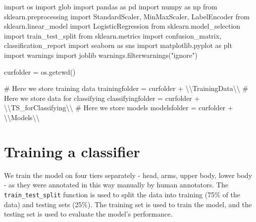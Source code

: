 \documentclass[
  letterpaper,
  DIV=11,
  numbers=noendperiod]{scrreprt}
\newenvironment{Shaded}{\begin{snugshade}}{\end{snugshade}}
\newcommand{\CharTok}[1]{\textcolor[rgb]{0.13,0.47,0.30}{#1}}
\newcommand{\CommentTok}[1]{\textcolor[rgb]{0.37,0.37,0.37}{#1}}
\newcommand{\ImportTok}[1]{\textcolor[rgb]{0.00,0.46,0.62}{#1}}
\newcommand{\NormalTok}[1]{\textcolor[rgb]{0.00,0.23,0.31}{#1}}
\newcommand{\OperatorTok}[1]{\textcolor[rgb]{0.37,0.37,0.37}{#1}}
\newcommand{\StringTok}[1]{\textcolor[rgb]{0.13,0.47,0.30}{#1}}
\begin{document}
\begin{Shaded}
\begin{Highlighting}[]
\ImportTok{import}\NormalTok{ os}
\ImportTok{import}\NormalTok{ glob}
\ImportTok{import}\NormalTok{ pandas }\ImportTok{as}\NormalTok{ pd}
\ImportTok{import}\NormalTok{ numpy }\ImportTok{as}\NormalTok{ np}
\ImportTok{from}\NormalTok{ sklearn.preprocessing }\ImportTok{import}\NormalTok{ StandardScaler, MinMaxScaler, LabelEncoder}
\ImportTok{from}\NormalTok{ sklearn.linear\_model }\ImportTok{import}\NormalTok{ LogisticRegression}
\ImportTok{from}\NormalTok{ sklearn.model\_selection }\ImportTok{import}\NormalTok{ train\_test\_split}
\ImportTok{from}\NormalTok{ sklearn.metrics }\ImportTok{import}\NormalTok{ confusion\_matrix, classification\_report}
\ImportTok{import}\NormalTok{ seaborn }\ImportTok{as}\NormalTok{ sns}
\ImportTok{import}\NormalTok{ matplotlib.pyplot }\ImportTok{as}\NormalTok{ plt}
\ImportTok{import}\NormalTok{ warnings}
\ImportTok{import}\NormalTok{ joblib}
\NormalTok{warnings.filterwarnings(}\StringTok{"ignore"}\NormalTok{)}

\NormalTok{curfolder }\OperatorTok{=}\NormalTok{ os.getcwd()}

\CommentTok{\# Here we store training data}
\NormalTok{trainingfolder }\OperatorTok{=}\NormalTok{ curfolder }\OperatorTok{+} \StringTok{\textquotesingle{}}\CharTok{\textbackslash{}\textbackslash{}}\StringTok{TrainingData}\CharTok{\textbackslash{}\textbackslash{}}\StringTok{\textquotesingle{}}
\CommentTok{\# Here we store data for classifying}
\NormalTok{classifyingfolder }\OperatorTok{=}\NormalTok{ curfolder }\OperatorTok{+} \StringTok{\textquotesingle{}}\CharTok{\textbackslash{}\textbackslash{}}\StringTok{TS\_forClassifying}\CharTok{\textbackslash{}\textbackslash{}}\StringTok{\textquotesingle{}}
\CommentTok{\# Here we store models}
\NormalTok{modelsfolder }\OperatorTok{=}\NormalTok{ curfolder }\OperatorTok{+} \StringTok{\textquotesingle{}}\CharTok{\textbackslash{}\textbackslash{}}\StringTok{Models}\CharTok{\textbackslash{}\textbackslash{}}\StringTok{\textquotesingle{}}
\end{Highlighting}
\end{Shaded}


\chapter{Training a classifier}\label{training-a-classifier}

We train the model on four tiers separately - head, arms, upper body,
lower body - as they were annotated in this way manually by human
annotators. The \texttt{train\_test\_split} function is used to split
the data into training (75\% of the data) and testing sets (25\%). The
training set is used to train the model, and the testing set is used to
evaluate the model's performance.
\end{document}
